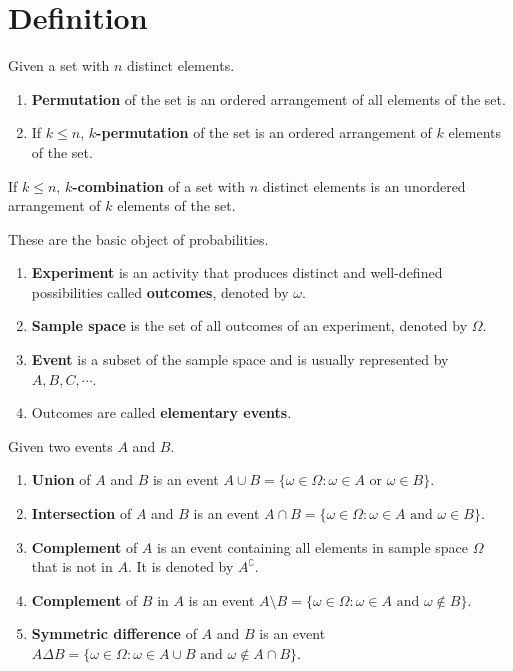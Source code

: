 \documentclass{huhtakm-template-book}
\begin{document}
\section*{Definition}
\begin{sdefn}
	Given a set with $n$ distinct elements.
	\begin{enumerate}
		\item \textbf{Permutation} of the set is an ordered arrangement of all elements of the set.
		\item If $k\leq n$, \textbf{$k$-permutation} of the set is an ordered arrangement of $k$ elements of the set.
	\end{enumerate}
\end{sdefn}
\begin{sdefn}
	If $k\leq n$, \textbf{$k$-combination} of a set with $n$ distinct elements is an unordered arrangement of $k$ elements of the set.
\end{sdefn}
\begin{sdefn}
	These are the basic object of probabilities.
	\begin{enumerate}
		\item \textbf{Experiment} is an activity that produces distinct and well-defined possibilities called \textbf{outcomes}, denoted by $\omega$.
		\item \textbf{Sample space} is the set of all outcomes of an experiment, denoted by $\Omega$.
		\item \textbf{Event} is a subset of the sample space and is usually represented by $A,B,C,\cdots$.
		\item Outcomes are called \textbf{elementary events}.
	\end{enumerate}	
\end{sdefn}
\begin{sdefn}
	Given two events $A$ and $B$.
	\begin{enumerate}
		\item \textbf{Union} of $A$ and $B$ is an event $A\cup B=\{\omega\in\Omega:\omega\in A\text{ or }\omega\in B\}$.
		\item \textbf{Intersection} of $A$ and $B$ is an event $A\cap B=\{\omega\in\Omega:\omega\in A\text{ and }\omega\in B\}$.
		\item \textbf{Complement} of $A$ is an event containing all elements in sample space $\Omega$ that is not in $A$. It is denoted by $A^{\complement}$.
		\item \textbf{Complement} of $B$ in $A$ is an event $A\setminus B=\{\omega\in\Omega:\omega\in A\text{ and }\omega\not\in B\}$.
		\item \textbf{Symmetric difference} of $A$ and $B$ is an event $A\Delta B=\{\omega\in\Omega:\omega\in A\cup B\text{ and }\omega\not\in A\cap B\}$.
	\end{enumerate}
\end{sdefn}
\end{document}
